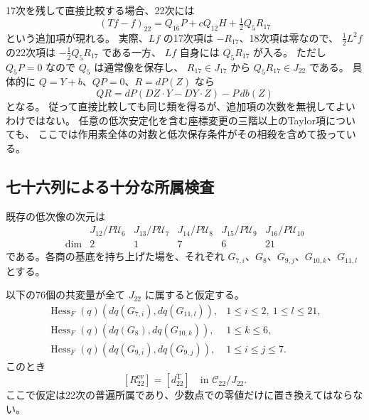 \begin{remark}[十七次を残した場合の二階対数項]
17次を残して直接比較する場合、22次には
\[
 (Tf-f)_{22}=Q_{16}P+cQ_{12}H+\tfrac12Q_5R_{17}
\]
という追加項が現れる。
実際、$Lf$ の17次項は $-R_{17}$、18次項は零なので、
$\tfrac12L^2f$ の22次項は $-\tfrac12Q_5R_{17}$ である一方、
$Lf$ 自身には $Q_5R_{17}$ が入る。
ただし $Q_5P=0$ なので $Q_5$ は通常像を保存し、
$R_{17}\in J_{17}$ から $Q_5R_{17}\in J_{22}$ である。
具体的に $Q=Y+b$、$QP=0$、$R=dP(Z)$ なら
\[
 QR=dP(DZ\cdot Y-DY\cdot Z)-P\,db(Z)
\]
となる。
従って直接比較しても同じ類を得るが、追加項の次数を無視してよいわけではない。
任意の低次安定化を含む座標変更の三階以上のTaylor項についても、
ここでは作用素全体の対数と低次保存条件がその相殺を含めて扱っている。
\end{remark}

\subsection{七十六列による十分な所属検査}

既存の低次像の次元は
\[
\begin{array}{c|ccccc}
 &J_{12}/P\mathcal U_6&J_{13}/P\mathcal U_7&J_{14}/P\mathcal U_8
 &J_{15}/P\mathcal U_9&J_{16}/P\mathcal U_{10}\\\hline
\dim&2&1&7&6&21
\end{array}
\]
である。各商の基底を持ち上げた場を、それぞれ
$G_{7,i}$、$G_8$、$G_{9,j}$、$G_{10,k}$、$G_{11,l}$ とする。

\begin{proposition}[二十二次補正の有限族への帰着]
\label{prop:v16-seventy-six-lower-pairings}
以下の76個の共変量が全て $J_{22}$ に属すると仮定する。
\[
\begin{array}{ll}
 \operatorname{Hess}_F(q)(dq(G_{7,i}),dq(G_{11,l})),&1\le i\le2,\ 1\le l\le21,\\
 \operatorname{Hess}_F(q)(dq(G_8),dq(G_{10,k})),&1\le k\le6,\\
 \operatorname{Hess}_F(q)(dq(G_{9,i}),dq(G_{9,j})),&1\le i\le j\le7.
\end{array}
\]
このとき
\begin{equation}\label{eq:v16-raw-twenty-second-suffices}
 [R_{22}^{\mathrm{ev}}]=[d_{22}^{\mathrm T}]
                         \quad\text{in }\mathcal C_{22}/J_{22}.
\end{equation}
ここで仮定は22次の普遍所属であり、少数点での零値だけに置き換えてはならない。
\end{proposition}

